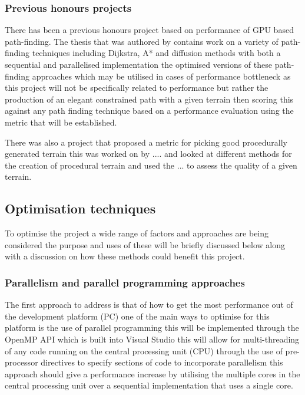 \subsubsection{Previous honours projects}
There has been a previous honours project based on performance of GPU based path-finding. The thesis that was authored by \cite{honours} contains work on a variety of path-finding techniques including Dijkstra, A* and diffusion methods with both a sequential and parallelised implementation the optimised versions of these path-finding approaches which may be utilised in cases of performance bottleneck as this project will not be specifically related to performance but rather the production of an elegant constrained path with a given terrain then scoring this against any path finding technique based on a performance evaluation using the metric that will be established.


There was also a project that proposed a metric for picking good procedurally generated terrain this was worked on by .... and looked at different methods for the creation of procedural terrain and used the ... to assess the quality of a given terrain.

\subsection{Optimisation techniques}
To optimise the project a wide range of factors and approaches are being considered the purpose and uses of these will be briefly discussed below along with a discussion on how these methods could benefit this project.\\

\subsubsection{Parallelism and parallel programming approaches}
The first approach to address is that of how to get the most performance out of the development platform (PC) one of the main ways to optimise for this platform is the use of parallel programming this will be implemented through the OpenMP API \cite{Openmp}which is built into Visual Studio this will allow for multi-threading of any code running on the central processing unit (CPU) through the use of pre-processor directives to specify sections of code to incorporate parallelism this approach should give a performance increase by utilising the multiple cores in the central processing unit over a sequential implementation that uses a single core.

